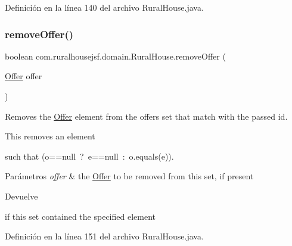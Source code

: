 Definición en la línea 140 del archivo Rural\+House.\+java.

\mbox{\label{a00188_a36466194bda46f454c816aa5845c0d14}} 
\subsubsection{\texorpdfstring{removeOffer()}{removeOffer()}\hspace{0.1cm}{\footnotesize\ttfamily [2/2]}}
{\footnotesize\ttfamily boolean com.\+ruralhousejsf.\+domain.\+Rural\+House.\+remove\+Offer (\begin{DoxyParamCaption}\item[{\mbox{\hyperlink{a00184}{Offer}}}]{offer }\end{DoxyParamCaption})}



Removes the \mbox{\hyperlink{a00184}{Offer}} element from the offers set that match with the passed id. 

This removes an element
\begin{DoxyCode}{0}
\end{DoxyCode}
 such that {\ttfamily (o==null~?~e==null~\+:~o.\+equals(e))}.


\begin{DoxyParams}{Parámetros}
{\em offer} & the \mbox{\hyperlink{a00184}{Offer}} to be removed from this set, if present \\
\hline
\end{DoxyParams}
\begin{DoxyReturn}{Devuelve}

\begin{DoxyCode}{0}
\DoxyCodeLine{\textcolor{keyword}{true} }
\end{DoxyCode}
 if this set contained the specified element 
\end{DoxyReturn}


Definición en la línea 151 del archivo Rural\+House.\+java.

\mbox{\label{a00188_a329be3e41ca6f9e57a0fc887c066ad55}} 

